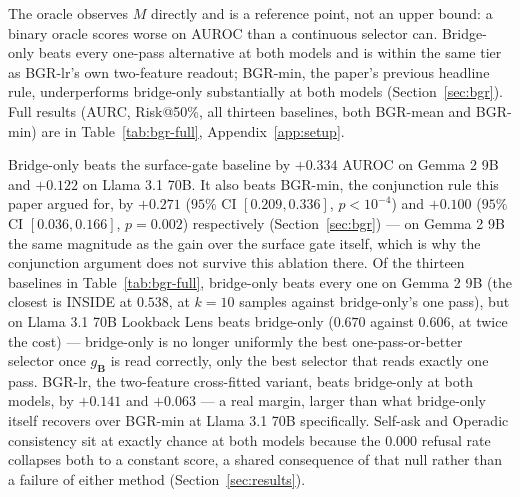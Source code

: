 \documentclass{article}
\newif\ifredflags
\newcommand{\rf}[1]{\ifredflags{\textcolor{red}{\textbf{[MISSING: #1]}}}\fi}
\newcommand{\rv}[1]{\ifredflags{\textcolor{red}{\textbf{[VERIFY: #1]}}}\fi}
\newcommand{\gate}{\mathbf{S}}
\newcommand{\bridge}{\mathbf{B}}
\begin{document}
\begin{center}
\vspace{2pt}
{\footnotesize The oracle observes $M$ directly and is a reference point, not an upper bound: a
binary oracle scores worse on AUROC than a continuous selector can. Bridge-only beats every one-pass
alternative at both models and is within the same tier as BGR-lr's own two-feature readout; BGR-min,
the paper's previous headline rule, underperforms bridge-only substantially at both models
(Section~\ref{sec:bgr}). Full results (AURC, Risk@50\%, all thirteen baselines, both BGR-mean and
BGR-min) are in Table~\ref{tab:bgr-full}, Appendix~\ref{app:setup}.
\rf{the correct ceiling, $R^\ast(g_{\mathcal{R}'},c)$, estimated by thresholding
$\hat\eta(\gate,\bridge)$ as in Section~\ref{sec:theory}. That is the quantity
$\widehat{\Delta}_{\mathrm{blind}}$ is defined against and a genuine upper bound on what any rule
reading both positions can do; the $M$-oracle row is not a substitute.}
\rv{an earlier version carried a $\hat\rho$ column reporting the share of
$\widehat{\Delta}_{\mathrm{blind}}$ each selector closes. Its values did not reconcile with the risks
they are computed from, each implying a different denominator, so the column is withdrawn. Recompute
it from the released per-item risks with a stated coverage and a bootstrap interval, or leave it out.}}
\vspace{-0.5em}
\end{center}

Bridge-only beats the surface-gate baseline by $+0.334$ AUROC on Gemma 2 9B and $+0.122$ on
Llama 3.1 70B. It also beats BGR-min, the conjunction rule this paper argued for, by $+0.271$
($95\%$ CI $[0.209,0.336]$, $p<10^{-4}$) and $+0.100$ ($95\%$ CI $[0.036,0.166]$, $p=0.002$)
respectively (Section~\ref{sec:bgr}) --- on Gemma 2 9B the same magnitude as the gain over the surface
gate itself, which is why the conjunction argument does not survive this ablation there. Of the
thirteen baselines in Table~\ref{tab:bgr-full}, bridge-only beats every one on Gemma 2 9B (the closest is
INSIDE \citep{chen2024inside} at $0.538$, at $k{=}10$ samples against bridge-only's one pass), but on
Llama 3.1 70B Lookback Lens \citep{chuang2024lookback} beats bridge-only ($0.670$ against $0.606$, at
twice the cost) --- bridge-only is no longer uniformly the best one-pass-or-better selector once
$g_{\bridge}$ is read correctly, only the best selector that reads exactly one pass. BGR-lr, the
two-feature cross-fitted variant, beats bridge-only at both models, by $+0.141$ and $+0.063$ --- a
real margin, larger than what bridge-only itself recovers over BGR-min at Llama 3.1 70B specifically.
Self-ask and Operadic consistency \citep{bottman2026operadic} sit at exactly chance at both models
because the $0.000$ refusal rate collapses both to a constant score, a shared consequence of that null
rather than a failure of either method (Section~\ref{sec:results}).
\end{document}
